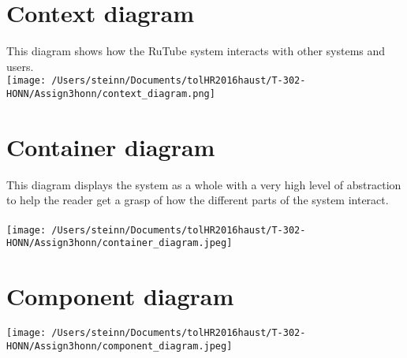 \documentclass[11pt, a4paper]{article}
\begin{document}
	\section{Context diagram}
	This diagram shows how the RuTube system interacts with other systems and users.\\
		\texttt{[image: /Users/steinn/Documents/tolHR2016haust/T-302-HONN/Assign3honn/context\_diagram.png]}

\newpage
	\section{Container diagram}
		This diagram displays the system as a whole with a very high level of abstraction to help the reader get a grasp of how the different parts of the system interact.\\~\\
\texttt{[image: /Users/steinn/Documents/tolHR2016haust/T-302-HONN/Assign3honn/container\_diagram.jpeg]}
\newpage
	\section{Component diagram}
	\texttt{[image: /Users/steinn/Documents/tolHR2016haust/T-302-HONN/Assign3honn/component\_diagram.jpeg]}
\newpage
\end{document}
